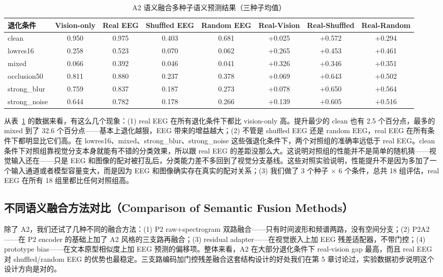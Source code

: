 \begin{table}[htbp]
  \centering
  \caption{A2 语义融合多种子语义预测结果（三种子均值）}
  \label{tab:a2-main}
  \begin{tabular}{l c c c c c c c}
    \toprule
    退化条件 & Vision-only & Real EEG & Shuffled EEG & Random EEG & Real-Vision & Real-Shuffled & Real-Random \\
    \midrule
    clean & 0.950 & 0.975 & 0.403 & 0.681 & +0.025 & +0.572 & +0.294 \\
    lowres16 & 0.258 & 0.523 & 0.070 & 0.062 & +0.265 & +0.453 & +0.461 \\
    mixed & 0.066 & 0.392 & 0.046 & 0.041 & +0.326 & +0.346 & +0.351 \\
    occlusion50 & 0.811 & 0.880 & 0.237 & 0.378 & +0.069 & +0.643 & +0.502 \\
    strong\_blur & 0.759 & 0.837 & 0.187 & 0.273 & +0.078 & +0.650 & +0.564 \\
    strong\_noise & 0.644 & 0.782 & 0.178 & 0.266 & +0.139 & +0.605 & +0.516 \\
    \bottomrule
  \end{tabular}
\end{table}

从表~\ref{tab:a2-main} 的数据来看，有这么几个现象：(1) real EEG 在所有退化条件下都比 vision-only 高。提升最少的 clean 也有 2.5 个百分点，最多的 mixed 到了 32.6 个百分点——基本上退化越狠，EEG 带来的增益越大；(2) 不管是 shuffled EEG 还是 random EEG，real EEG 在所有条件下都明显比它们高。在 lowres16、mixed、strong\_blur、strong\_noise 这些强退化条件下，两个对照组的准确率远低于 real EEG。clean 条件下对照组靠视觉分支本身就能有不错的分类效果，所以跟 real EEG 的差距没那么大。这说明对照组的性能并不是简单的随机猜——视觉输入还在——只是 EEG 和图像的配对被打乱后，分类能力差不多回到了视觉分支基线。这些对照实验说明，性能提升不是因为多加了一个输入通道或者模型容量变大，而是因为 EEG 和图像确实存在真实的配对关系；(3) 我们做了 3 个种子 $\times$ 6 个条件，总共 18 组评估，real EEG 在所有 18 组里都比任何对照组高。


\subsection{不同语义融合方法对比（Comparison of Semantic Fusion Methods）}

除了 A2，我们还试了几种不同的融合方法：(1) P2 raw+spectrogram 双路融合——只有时间波形和频谱两路，没有空间分支；(2) P2A2——在 P2 encoder 的基础上加了 A2 风格的三支路再融合；(3) residual adapter——在视觉嵌入上加 EEG 残差适配器，不带门控；(4) prototype bias——在文本原型相似度上加 EEG 预测的偏移项。整体来看，A2 在大部分退化条件下 real-vision gap 最高，而且 real EEG 对 shuffled/random EEG 的优势也最稳定。三支路编码加门控残差融合这套结构设计的好处我们在第 5 章讨论过，实验数据初步说明这个设计方向是对的。

